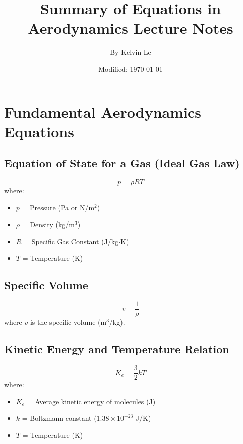 \documentclass{article}
\begin{document}
\title{Summary of Equations in Aerodynamics Lecture Notes}
\author{By Kelvin Le}
\date{Modified: \today}
\maketitle

\tableofcontents

\section{Fundamental Aerodynamics Equations}

\subsection{Equation of State for a Gas (Ideal Gas Law)}
\begin{equation}
    p = \rho R T
\end{equation}
where:
\begin{itemize}
    \item $p$ = Pressure (Pa or N/m$^2$)
    \item $\rho$ = Density (kg/m$^3$)
    \item $R$ = Specific Gas Constant (J/kg$\cdot$K)
    \item $T$ = Temperature (K)
\end{itemize}

\subsection{Specific Volume}
\begin{equation}
    v = \frac{1}{\rho}
\end{equation}
where $v$ is the specific volume (m$^3$/kg).

\subsection{Kinetic Energy and Temperature Relation}
\begin{equation}
    K_e = \frac{3}{2} k T
\end{equation}
where:
\begin{itemize}
    \item $K_e$ = Average kinetic energy of molecules (J)
    \item $k$ = Boltzmann constant ($1.38 \times 10^{-23}$ J/K)
    \item $T$ = Temperature (K)
\end{itemize}
\end{document}
